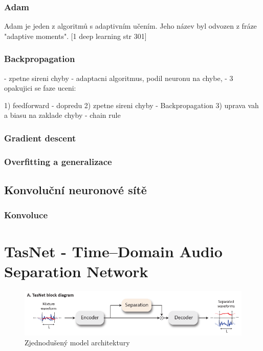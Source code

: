 \subsection*{Adam}


Adam je jeden z algoritmů s adaptivním učením. Jeho název byl odvozen z fráze "adaptive moments".  [1 deep learning str 301]


\subsection{Backpropagation}
- zpetne sireni chyby
- adaptacni algoritmus, podil neuronu na chybe,
- 3 opakujici se faze uceni:


1) feedforward - dopredu
2) zpetne sireni chyby - Backpropagation
3) uprava vah a biasu na zaklade chyby
- chain rule



\subsection*{Gradient descent}

\subsection{Overfitting a generalizace}

\section{Konvoluční neuronové sítě}

\subsection{Konvoluce}




\chapter{TasNet - Time--Domain Audio Separation Network}
\label{tasnet}
\begin{figure}[H]
    \centering
    \includegraphics[scale=0.5]{obrazky-figures/tasnet-pipe.png}
    \caption{\label{fig:tasnet-pipe}Zjednodušený model architektury}
\end{figure}


